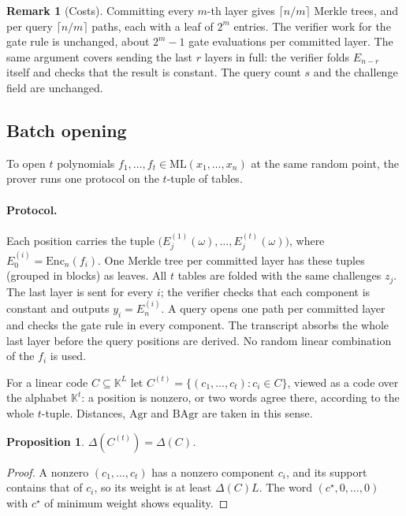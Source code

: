 \documentclass[11pt]{article}
\newtheorem{proposition}[theorem]{Proposition}
\theoremstyle{definition}
\newtheorem{remark}[theorem]{Remark}
\newcommand{\K}{\mathbb{K}}
\newcommand{\ML}{\mathrm{ML}}
\newcommand{\Enc}{\mathrm{Enc}}
\begin{document}
\begin{remark}[Costs]
Committing every $m$-th layer gives $\lceil n/m\rceil$ Merkle trees, and per query $\lceil n/m\rceil$
paths, each with a leaf of $2^m$ entries. The verifier work for the gate rule is unchanged, about
$2^m-1$ gate evaluations per committed layer. The same argument covers sending the last $r$ layers
in full: the verifier folds $E_{n-r}$ itself and checks that the result is constant. The query
count $s$ and the challenge field are unchanged.
\end{remark}

\subsection{Batch opening}

To open $t$ polynomials $f_1,\dots,f_t\in\ML(x_1,\dots,x_n)$ at the same random point, the prover
runs one protocol on the $t$-tuple of tables.

\paragraph{Protocol.} Each position carries the tuple $\bigl(E_j^{(1)}(\omega),\dots,E_j^{(t)}(\omega)\bigr)$,
where $E_0^{(i)}=\Enc_n(f_i)$. One Merkle tree per committed layer has these tuples (grouped in blocks) as
leaves. All $t$ tables are folded with the same challenges $z_j$. The last layer is sent for every
$i$; the verifier checks that each component is constant and outputs $y_i=E_n^{(i)}$. A query opens one
path per committed layer and checks the gate rule in every component. The transcript absorbs the whole
last layer before the query positions are derived. No random linear combination of the $f_i$ is used.

For a linear code $C\subseteq\K^L$ let $C^{(t)}=\{(c_1,\dots,c_t):c_i\in C\}$, viewed as a code over the
alphabet $\K^t$: a position is nonzero, or two words agree there, according to the whole $t$-tuple.
Distances, $\mathrm{Agr}$ and $\mathrm{BAgr}$ are taken in this sense.

\begin{proposition}\label{prop:interleave}
$\Delta(C^{(t)})=\Delta(C)$.
\end{proposition}
\begin{proof}
A nonzero $(c_1,\dots,c_t)$ has a nonzero component $c_i$, and its support contains that of $c_i$, so
its weight is at least $\Delta(C)L$. The word $(c^\star,0,\dots,0)$ with $c^\star$ of minimum weight shows equality.
\end{proof}
\end{document}
